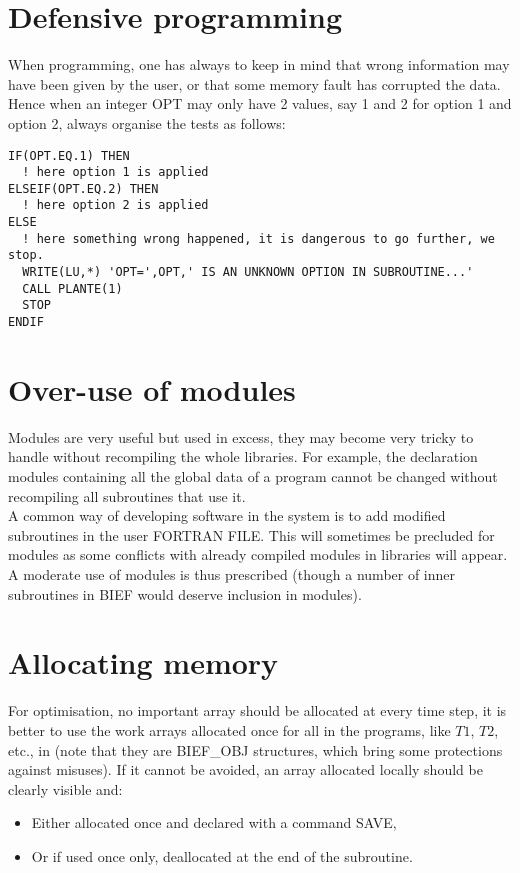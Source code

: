 \section{Defensive programming}

When programming, one has always to keep in mind that wrong information may
have been given by the user, or that some memory fault has corrupted the data.
Hence when an integer OPT may only have 2 values, say 1 and 2 for option 1 and
option 2, always organise the tests as follows:\\
\begin{lstlisting}
IF(OPT.EQ.1) THEN
  ! here option 1 is applied
ELSEIF(OPT.EQ.2) THEN
  ! here option 2 is applied
ELSE
  ! here something wrong happened, it is dangerous to go further, we stop.
  WRITE(LU,*) 'OPT=',OPT,' IS AN UNKNOWN OPTION IN SUBROUTINE...'
  CALL PLANTE(1)
  STOP
ENDIF
\end{lstlisting}

\section{Over-use of modules}

Modules are very useful but used in excess, they may become very tricky to
handle without recompiling the whole libraries. For example, the declaration
modules containing all the global data of a program cannot be changed without
recompiling all subroutines that use it.\\

A common way of developing software in the \telemacsystem system is to add
modified subroutines in the user FORTRAN FILE. This will sometimes be precluded
for modules as some conflicts with already compiled modules in libraries will
appear.\\

A moderate use of modules is thus prescribed (though a number of inner
subroutines in BIEF would deserve inclusion in modules).

\section{Allocating memory}

For optimisation, no important array should be allocated at every time step, it
is better to use the work arrays allocated once for all in the \telemacsystem
programs, like $T1$, $T2$, etc., in  (note that they are BIEF\_OBJ
structures, which bring some protections against misuses).  If it cannot be
avoided, an array allocated locally should be clearly visible and:
\begin{itemize}
\item Either allocated once and declared with a command SAVE,
\item Or if used once only, deallocated at the end of the subroutine.
\end{itemize}

